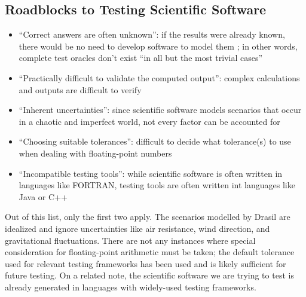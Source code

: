 \subsection{Roadblocks to Testing Scientific Software
      \citep[p.~67]{KanewalaAndYuehChen2019}}
\label{chap:notes:sec:sci-testing-roadblocks}
\begin{itemize}
      \item ``Correct answers are often unknown'': if the results were already
            known, there would be no need to develop software to model them
            \citep[p.~67]{KanewalaAndYuehChen2019}; in other words, complete
            test oracles don't exist ``in all but the most trivial cases''
            \citep[p.~510]{BarrEtAl2015}
      \item ``Practically difficult to validate the computed output'': complex
            calculations and outputs are difficult to verify
            \citep[p.~67]{KanewalaAndYuehChen2019}
      \item ``Inherent uncertainties'': since scientific software models
            scenarios that occur in a chaotic and imperfect world, not every
            factor can be accounted for \citep[p.~67]{KanewalaAndYuehChen2019}
      \item ``Choosing suitable tolerances'': difficult to decide what
            tolerance(s) to use when dealing with floating-point numbers
            \citep[p.~67]{KanewalaAndYuehChen2019}
      \item ``Incompatible testing tools'': while scientific software is often
            written in languages like FORTRAN, testing tools are often written
            int languages like Java or C++ \citep[p.~67]{KanewalaAndYuehChen2019}
\end{itemize}

Out of this list, only the first two apply. The scenarios modelled by Drasil
are idealized and ignore uncertainties like air resistance, wind direction,
and gravitational fluctuations. There are not any instances where special
consideration for floating-point arithmetic must be taken; the default
tolerance used for relevant testing frameworks has been used
 and is likely sufficient for future testing. On a related
note, the scientific software we are trying to test is already generated in
languages with widely-used testing frameworks. 
